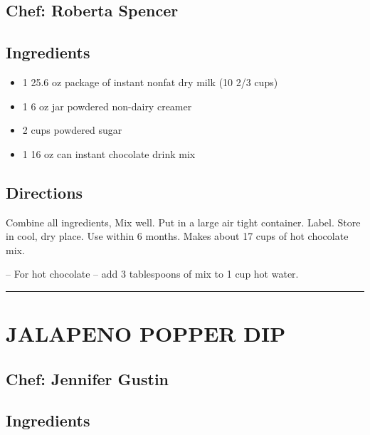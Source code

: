 \documentclass[
]{book}
\providecommand{\tightlist}{%
  \setlength{\itemsep}{0pt}\setlength{\parskip}{0pt}}
\begin{document}
\hypertarget{chef-roberta-spencer}{%
\subsection*{Chef: Roberta Spencer}\label{chef-roberta-spencer}}


\hypertarget{ingredients-7}{%
\subsection*{Ingredients}\label{ingredients-7}}


\begin{itemize}
\tightlist
\item
  1 25.6 oz package of instant nonfat dry milk (10 2/3 cups)
\item
  1 6 oz jar powdered non-dairy creamer
\item
  2 cups powdered sugar
\item
  1 16 oz can instant chocolate drink mix
\end{itemize}

\hypertarget{directions-7}{%
\subsection*{Directions}\label{directions-7}}


Combine all ingredients, Mix well. Put in a large air tight container. Label. Store in cool, dry place. Use within 6 months. Makes about 17 cups of hot chocolate mix.

-- For hot chocolate -- add 3 tablespoons of mix to 1 cup hot water.

\begin{center}\rule{0.5\linewidth}{0.5pt}\end{center}

\hypertarget{jalapeno-popper-dip}{%
\section*{JALAPENO POPPER DIP}\label{jalapeno-popper-dip}}


\hypertarget{chef-jennifer-gustin-2}{%
\subsection*{Chef: Jennifer Gustin}\label{chef-jennifer-gustin-2}}


\hypertarget{ingredients-8}{%
\subsection*{Ingredients}\label{ingredients-8}}
\end{document}
